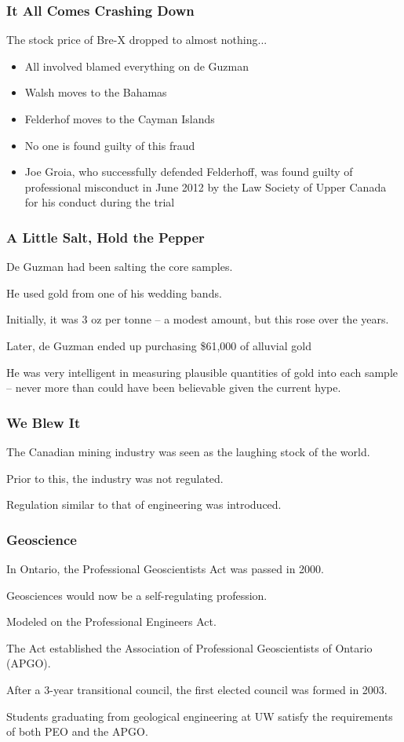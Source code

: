 \begin{frame}
\frametitle{It All Comes Crashing Down}

The stock price of Bre-X dropped to almost nothing...
\begin{itemize}
\item All involved blamed everything on de Guzman
\item Walsh moves to the Bahamas
\item Felderhof moves to the Cayman Islands
\item No one is found guilty of this fraud
\item Joe Groia, who successfully defended Felderhoff, was found guilty of professional misconduct in June 2012 by the Law Society of Upper Canada for his conduct during the trial
\end{itemize}


\end{frame}



\begin{frame}
\frametitle{A Little Salt, Hold the Pepper}

De Guzman had been salting the core samples.

He used gold from one of his wedding bands.

Initially, it was 3 oz per tonne -- a modest amount, but this rose over the years.

Later, de Guzman ended up purchasing \$61,000 of alluvial gold

He was very intelligent in measuring plausible quantities of gold into each sample -- never more than could have been believable given the current hype.

\end{frame}



\begin{frame}
\frametitle{We Blew It}

The Canadian mining industry was seen as the laughing stock of the world.

Prior to this, the industry was not regulated.

Regulation similar to that of engineering was introduced.

\end{frame}



\begin{frame}
\frametitle{Geoscience}

In Ontario, the Professional Geoscientists Act was passed in 2000.

Geosciences would now be a self-regulating profession.

Modeled on the Professional Engineers Act.

The Act established the Association of Professional Geoscientists of Ontario (APGO).

After a 3-year transitional council, the first elected council was formed in 2003.

Students graduating from geological engineering at UW satisfy the requirements of both PEO and the APGO.

\end{frame}



